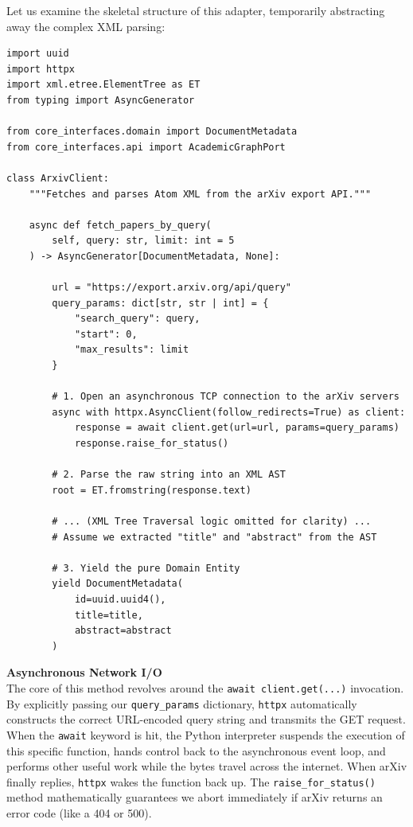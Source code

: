Let us examine the skeletal structure of this adapter, temporarily abstracting away the complex XML parsing:

\begin{lstlisting}[caption={The arXiv API Adapter (Simplified)}]
import uuid
import httpx
import xml.etree.ElementTree as ET
from typing import AsyncGenerator

from core_interfaces.domain import DocumentMetadata
from core_interfaces.api import AcademicGraphPort

class ArxivClient:
    """Fetches and parses Atom XML from the arXiv export API."""

    async def fetch_papers_by_query(
        self, query: str, limit: int = 5
    ) -> AsyncGenerator[DocumentMetadata, None]:

        url = "https://export.arxiv.org/api/query"
        query_params: dict[str, str | int] = {
            "search_query": query,
            "start": 0,
            "max_results": limit
        }

        # 1. Open an asynchronous TCP connection to the arXiv servers
        async with httpx.AsyncClient(follow_redirects=True) as client:
            response = await client.get(url=url, params=query_params)
            response.raise_for_status()

        # 2. Parse the raw string into an XML AST
        root = ET.fromstring(response.text)

        # ... (XML Tree Traversal logic omitted for clarity) ...
        # Assume we extracted "title" and "abstract" from the AST

        # 3. Yield the pure Domain Entity
        yield DocumentMetadata(
            id=uuid.uuid4(),
            title=title,
            abstract=abstract
        )
\end{lstlisting}

\textbf{Asynchronous Network I/O} \\
The core of this method revolves around the \texttt{await client.get(...)} invocation. By explicitly passing our \texttt{query\_params} dictionary, \texttt{httpx} automatically constructs the correct URL-encoded query string and transmits the GET request. When the \texttt{await} keyword is hit, the Python interpreter suspends the execution of this specific function, hands control back to the asynchronous event loop, and performs other useful work while the bytes travel across the internet. When arXiv finally replies, \texttt{httpx} wakes the function back up. The \texttt{raise\_for\_status()} method mathematically guarantees we abort immediately if arXiv returns an error code (like a 404 or 500).

